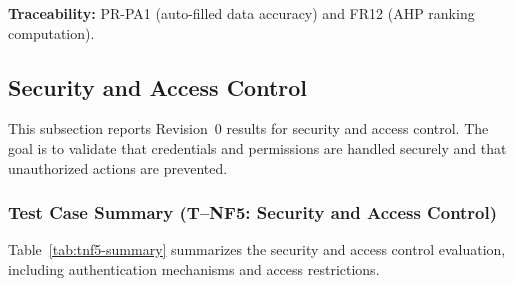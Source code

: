 \documentclass[12pt, titlepage]{article}
\begin{document}
\noindent \textbf{Traceability:} PR-PA1 (auto-filled data accuracy) and FR12
(AHP ranking computation).

\subsection{Security and Access Control}
\label{sec:nfr-security}

This subsection reports Revision~0 results for security and access control.
The goal is to validate that credentials and permissions are handled securely
and that unauthorized actions are prevented.

\subsubsection{Test Case Summary (T--NF5: Security and Access Control)}
Table~\ref{tab:tnf5-summary} summarizes the security and access control evaluation, including authentication mechanisms and access restrictions.
\end{document}
